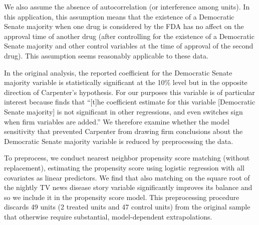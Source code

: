 \documentclass[11pt,titlepage]{article}
\begin{document}
We also assume the absence of autocorrelation (or interference among
units).  In this application, this assumption means that the existence
of a Democratic Senate majority when one drug is considered by the FDA
has no affect on the approval time of another drug (after
controlling for the existence of a Democratic Senate majority and
other control variables at the time of approval of the second drug).
This assumption seems reasonably applicable to these data.

In the original analysis, the reported coefficient for the Democratic
Senate majority variable is statistically significant at the 10\%
level but in the opposite direction of Carpenter's hypothesis.  For
our purposes this variable is of particular interest because
\citet[p.498]{Carp02} finds that ``[t]he coefficient estimate for this
variable [Democratic Senate majority] is not significant in other
regressions, and even switches sign when firm variables are added.''
We therefore examine whether the model sensitivity that prevented
Carpenter from drawing firm conclusions about the Democratic Senate
majority variable is reduced by preprocessing the data.

To preprocess, we conduct nearest neighbor propensity score matching
(without replacement), estimating the propensity score using logistic
regression with all covariates as linear predictors. We find that also
matching on the square root of the nightly TV news disease story
variable significantly improves its balance and so we include it in the propensity score model.
This preprocessing procedure discards 49 units (2 treated units and 47
control units) from the original sample that otherwise require
substantial, model-dependent extrapolations.
\end{document}
